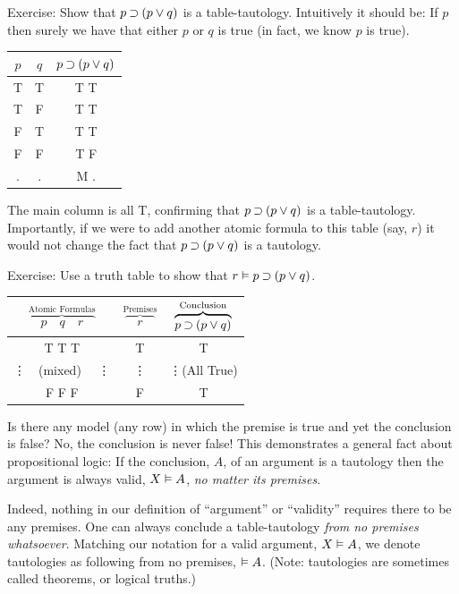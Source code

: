 \documentclass[options]{philosophersimprint}
\theoremstyle{definition}
\begin{document}
Exercise: Show that $p\mathbin{\supset} (p\mathbin{\vee} q)$ is a table-tautology. Intuitively it should be: If $p$ then surely we have that either $p$ or $q$ is true (in fact, we know $p$ is true).

\begin{table}[h!]
    \centering
    \begin{tabular}{c c | c}
        $p$ & $q$ & $p \mathbin{\supset} (p \mathbin{\vee} q)$ \\
        \hline
        T & T & T \quad T \\
        T & F & T \quad T \\
        F & T & T \quad T \\
        F & F & T \quad F \\
        $.$ & $.$ & M \quad $.$ \\
    \end{tabular}
\end{table}

The main column is all T, confirming that $p \mathbin{\supset} (p \mathbin{\vee} q)$ is a table-tautology. Importantly, if we were to add another atomic formula to this table (say, $r$) it would not change the fact that $p \mathbin{\supset} (p \mathbin{\vee} q)$ is a tautology.

Exercise: Use a truth table to show that $r \vDash p \mathbin{\supset} (p \mathbin{\vee} q)$.
\begin{table}[h!]
    \centering
    \begin{tabular}{c | c | c}
        $\overbrace{\quad p \quad q \quad r\quad}^\text{Atomic Formulas}$ & $\overbrace{\quad r \quad }^\text{Premises}$ & $\overbrace{ p \mathbin{\supset} (p \mathbin{\vee} q)}^\text{Conclusion}$\\
        \hline
        T \quad T \quad T & T & T\\
        \vdots \ \ (mixed) \ \ \vdots & \vdots & \qquad \qquad \quad \vdots \quad (All True)\\
        F \quad F \quad F & F & T\\
    \end{tabular}
\end{table}

Is there any model (any row) in which the premise is true and yet the conclusion is false? No, the conclusion is never false! This demonstrates a general fact about propositional logic: If the conclusion, $A$, of an argument is a tautology then the argument is always valid, $X\vDash A$, \textit{no matter its premises}.

Indeed, nothing in our definition of ``argument'' or ``validity'' requires there to be any premises. One can always conclude a table-tautology \textit{from no premises whatsoever}. Matching our notation for a valid argument, $X \vDash A$, we denote tautologies as following from no premises, $\vDash A$. (Note: tautologies are sometimes called theorems, or logical truths.)
\end{document}
